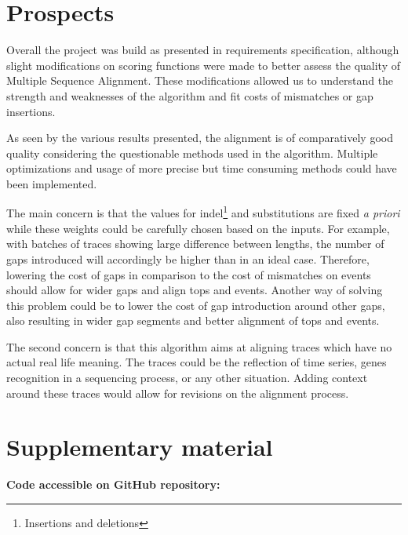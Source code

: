 \documentclass[12pt,a4paper]{article}
\begin{document}
\section{Prospects}
Overall the project was build as presented in requirements specification, although slight modifications on scoring functions were made to better assess the quality of Multiple Sequence Alignment.
These modifications allowed us to understand the strength and weaknesses of the algorithm and fit costs of mismatches or gap insertions.

As seen by the various results presented, the alignment is of comparatively good quality considering the questionable methods used in the algorithm.
Multiple optimizations and usage of more precise but time consuming methods could have been implemented.

The main concern is that the values for indel\footnote{Insertions and deletions} and substitutions are fixed \emph{a priori} while these weights could be carefully chosen based on the inputs.
For example, with batches of traces showing large difference between lengths, the number of gaps introduced will accordingly be higher than in an ideal case.
Therefore, lowering the cost of gaps in comparison to the cost of mismatches on events should allow for wider gaps and align tops and events.
Another way of solving this problem could be to lower the cost of gap introduction around other gaps, also resulting in wider gap segments and better alignment of tops and events.

The second concern is that this algorithm aims at aligning traces which have no actual real life meaning.
The traces could be the reflection of time series, genes recognition in a sequencing process, or any other situation.
Adding context around these traces would allow for revisions on the alignment process.

\pagebreak




\section*{Supplementary material}

\noindent\footnotesize{\textbf{Code accessible on GitHub repository:}
\href{https://github.com/Damien-Garcia-Bioinformatics/aap\_mma\_project}{\color{blue}{https://github.com/Damien-Garcia-Bioinformatics/aap\_mma\_project}}}
\end{document}
